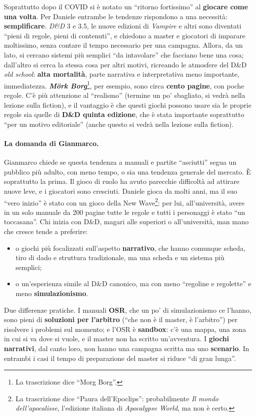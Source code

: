 Soprattutto dopo il COVID si è notato un ``ritorno fortissimo'' al
\textbf{giocare come una volta}. Per Daniele entrambe le tendenze rispondono a
una necessità: \textbf{semplificare}. \emph{D\&D} 3 e 3.5, le nuove edizioni di
\emph{Vampire} e altri sono diventati ``pieni di regole, pieni di contenuti'', e
chiedono a master e giocatori di imparare moltissimo, senza contare il tempo
necessario per una campagna. Allora, da un lato, si cercano sistemi più semplici
``da intavolare'' che facciano bene una cosa; dall'altro si cerca la stessa cosa
per altri motivi, ricreando le atmosfere del D\&D \emph{old school}: \textbf{alta
mortalità}, parte narrativa e interpretativa meno importante, immediatezza.
\textbf{\emph{Mörk Borg}}\footnote{La trascrizione dice ``Morg Borg''.}, per
esempio, sono circa \textbf{cento pagine}, con poche regole. C'è più attenzione
al ``realismo'' (termine un po' sbagliato, si vedrà nella lezione sulla
fiction), e il vantaggio è che questi giochi possono usare sia le proprie regole
sia quelle di \textbf{D\&D quinta edizione}, che è stata importante soprattutto
``per un motivo editoriale'' (anche questo si vedrà nella lezione sulla
fiction).

\paragraph{La domanda di Gianmarco.} Gianmarco chiede se questa tendenza a
manuali e partite ``asciutti'' segua un pubblico più adulto, con meno tempo, o
sia una tendenza generale del mercato. È soprattutto la prima. Il gioco di ruolo
ha avuto parecchie difficoltà ad attirare nuove leve, e i giocatori sono
cresciuti. Daniele gioca da molti anni, ma il suo ``vero inizio'' è stato con un
gioco della New Wave\footnote{La trascrizione dice ``Paura dell'Epoclips'':
probabilmente \emph{Il mondo dell'apocalisse}, l'edizione italiana di
\emph{Apocalypse World}, ma non è certo.}: per lui, all'università, avere in un
solo manuale da 200 pagine tutte le regole e tutti i personaggi è stato ``un
toccasana''. Chi inizia con D\&D, magari alle superiori o all'università, man
mano che cresce tende a preferire:
\begin{itemize}
  \item o giochi più focalizzati sull'aspetto \textbf{narrativo}, che hanno
        comunque scheda, tiro di dado e struttura tradizionale, ma una scheda e
        un sistema più semplici;
  \item o un'esperienza simile al D\&D canonico, ma con meno ``regoline e
        regolette'' e meno \textbf{simulazionismo}.
\end{itemize}
Due differenze pratiche. I manuali \textbf{OSR}, che un po' di simulazionismo ce
l'hanno, sono pieni di \textbf{soluzioni per l'arbitro} (``che non è il master,
è l'arbitro'') per risolvere i problemi sul momento; e l'OSR è \textbf{sandbox}:
c'è una mappa, una zona in cui si va dove si vuole, e il master non ha scritto
un'avventura. I \textbf{giochi narrativi}, dal canto loro, non hanno una campagna
scritta ma uno \textbf{scenario}. In entrambi i casi il tempo di preparazione del
master si riduce ``di gran lunga''.

